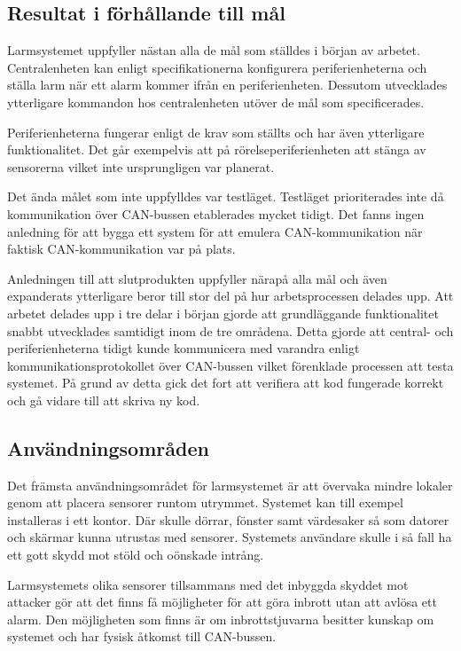 \documentclass[a4paper]{article}
\begin{document}
\subsection{Resultat i förhållande till mål}

Larmsystemet uppfyller nästan alla de mål som ställdes i början av arbetet.
Centralenheten kan enligt specifikationerna konfigurera periferienheterna och ställa larm när ett alarm kommer ifrån en periferienheten.
Dessutom utvecklades ytterligare kommandon hos centralenheten utöver de mål som specificerades.

Periferienheterna fungerar enligt de krav som ställts och har även ytterligare funktionalitet.
Det går exempelvis att på rörelseperiferienheten att stänga av sensorerna vilket inte ursprungligen var planerat.

Det ända målet som inte uppfylldes var testläget.
Testläget prioriterades inte då kommunikation över CAN-bussen etablerades mycket tidigt.
Det fanns ingen anledning för att bygga ett system för att emulera CAN-kommunikation när faktisk CAN-kommunikation var på plats.

Anledningen till att slutprodukten uppfyller närapå alla mål och även expanderats ytterligare beror till stor del på hur arbetsprocessen delades upp.
Att arbetet delades upp i tre delar i början gjorde att grundläggande funktionalitet snabbt utvecklades samtidigt inom de tre områdena.
Detta gjorde att central- och periferienheterna tidigt kunde kommunicera med varandra enligt kommunikationsprotokollet över CAN-bussen vilket förenklade processen att testa systemet.
På grund av detta gick det fort att verifiera att kod fungerade korrekt och gå vidare till att skriva ny kod.

\subsection{Användningsområden}
Det främsta användningsområdet för larmsystemet är att övervaka mindre lokaler genom att placera sensorer runtom utrymmet.
Systemet kan till exempel installeras i ett kontor.
Där skulle dörrar, fönster samt värdesaker så som datorer och skärmar kunna utrustas med sensorer.
Systemets användare skulle i så fall ha ett gott skydd mot stöld och oönskade intrång.

Larmsystemets olika sensorer tillsammans med det inbyggda skyddet mot attacker gör att det finns få möjligheter för att göra inbrott utan att avlösa ett alarm.
Den möjligheten som finns är om inbrottstjuvarna besitter kunskap om systemet och har fysisk åtkomst till CAN-bussen.
\end{document}

